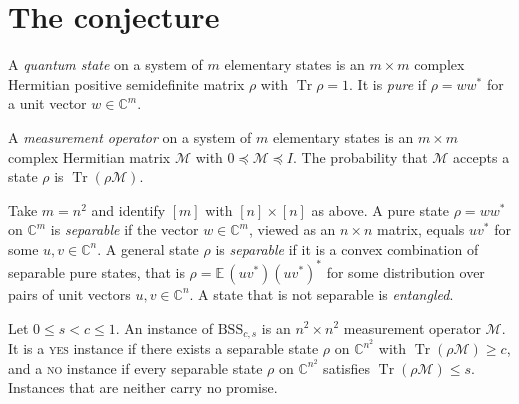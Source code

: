 \documentclass{conjura-conjecture}
\newcommand{\BSS}{\mathrm{BSS}}
\newcommand{\Tr}{\operatorname{Tr}}
\newcommand{\CC}{\mathbb{C}}
\begin{document}
\section{The conjecture}\label{sec:conjectures}

\begin{definition}\label{def:state}
A \emph{quantum state} on a system of $m$ elementary states is an
$m \times m$ complex Hermitian positive semidefinite matrix $\rho$ with
$\Tr \rho = 1$. It is \emph{pure} if $\rho = w w^{*}$ for a unit vector
$w \in \CC^{m}$.
\end{definition}

\begin{definition}\label{def:meas}
A \emph{measurement operator} on a system of $m$ elementary states is an
$m \times m$ complex Hermitian matrix $\mathcal{M}$ with
$0 \preceq \mathcal{M} \preceq I$. The probability that $\mathcal{M}$
accepts a state $\rho$ is $\Tr(\rho \mathcal{M})$.
\end{definition}

\begin{definition}\label{def:sep}
Take $m = n^{2}$ and identify $[m]$ with $[n] \times [n]$ as above. A
pure state $\rho = w w^{*}$ on $\CC^{m}$ is \emph{separable} if the
vector $w \in \CC^{m}$, viewed as an $n \times n$ matrix, equals
$u v^{*}$ for some $u, v \in \CC^{n}$. A general state $\rho$ is
\emph{separable} if it is a convex combination of separable pure states,
that is $\rho = \mathbb{E}\,(u v^{*})(u v^{*})^{*}$ for some
distribution over pairs of unit vectors $u, v \in \CC^{n}$. A state that
is not separable is \emph{entangled}.
\end{definition}

\begin{definition}[The promise problem $\BSS_{c,s}$]\label{def:bss}
Let $0 \le s < c \le 1$. An instance of $\BSS_{c,s}$ is an
$n^{2} \times n^{2}$ measurement operator $\mathcal{M}$. It is a
\textsc{yes} instance if there exists a separable state $\rho$ on
$\CC^{n^{2}}$ with $\Tr(\rho \mathcal{M}) \ge c$, and a \textsc{no}
instance if every separable state $\rho$ on $\CC^{n^{2}}$ satisfies
$\Tr(\rho \mathcal{M}) \le s$. Instances that are neither carry no
promise.
\end{definition}
\end{document}
